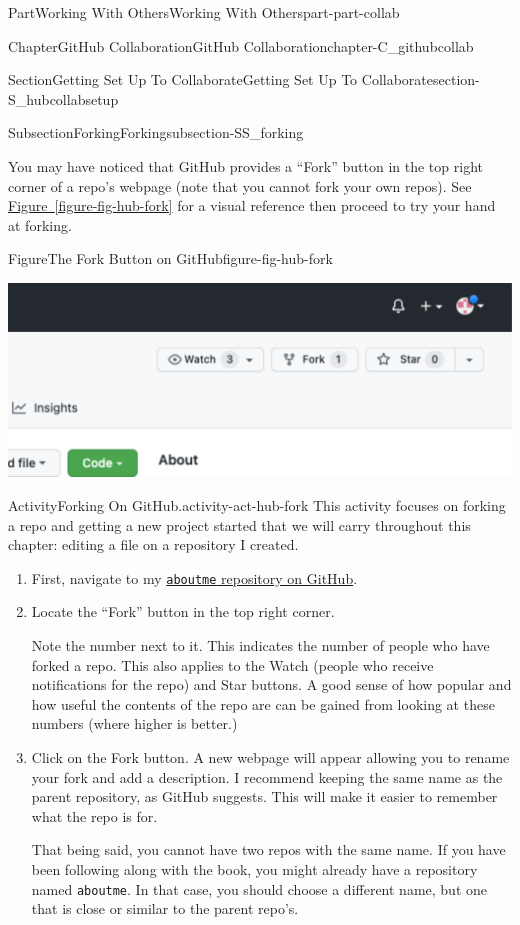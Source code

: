 \documentclass[oneside,10pt,]{book}
\newcommand{\xreffont}{\relax}
\newcommand{\mono}[1]{\texttt{#1}}
\begin{document}
\begin{partptx}{Part}{Working With Others}{}{Working With Others}{}{}{part-part-collab}
\begin{chapterptx}{Chapter}{GitHub Collaboration}{}{GitHub Collaboration}{}{}{chapter-C_githubcollab}
\begin{sectionptx}{Section}{Getting Set Up To Collaborate}{}{Getting Set Up To Collaborate}{}{}{section-S_hubcollabsetup}
\begin{subsectionptx}{Subsection}{Forking}{}{Forking}{}{}{subsection-SS_forking}
\par
You may have noticed that GitHub provides a ``Fork'' button in the top right corner of a repo's webpage (note that you cannot fork your own repos). See \hyperref[figure-fig-hub-fork]{Figure~{\xreffont\ref{figure-fig-hub-fork}}} for a visual reference then proceed to try your hand at forking.%
\begin{figureptx}{Figure}{The Fork Button on GitHub}{figure-fig-hub-fork}{}%
\begin{image}{0.1}{0.8}{0.1}{}%
\includegraphics[width=\linewidth]{external/hub_fork.pdf}
\end{image}%
\tcblower
\end{figureptx}%
\begin{activity}{Activity}{Forking On GitHub.}{activity-act-hub-fork}%
This activity focuses on forking a repo and getting a new project started that we will carry throughout this chapter: editing a file on a repository I created.%
\begin{enumerate}[font=\bfseries,label=(\alph*),ref=\alph*]%
\item{}First, navigate to my \href{https://github.com/ian-curtis/aboutme}{\mono{aboutme} repository on GitHub}\footnotemark{}.%
\item{}Locate the ``Fork'' button in the top right corner.%
\par
Note the number next to it. This indicates the number of people who have forked a repo. This also applies to the Watch (people who receive notifications for the repo) and Star buttons. A good sense of how popular and how useful the contents of the repo are can be gained from looking at these numbers (where higher is better.)%
\item{}Click on the Fork button. A new webpage will appear allowing you to rename your fork and add a description. I recommend keeping the same name as the parent repository, as GitHub suggests. This will make it easier to remember what the repo is for.%
\par
That being said, you cannot have two repos with the same name. If you have been following along with the book, you might already have a repository named \mono{aboutme}. In that case, you should choose a different name, but one that is close or similar to the parent repo's.%

\end{enumerate}
\end{activity}
\end{subsectionptx}
\end{sectionptx}
\end{chapterptx}
\end{partptx}
\end{document}

